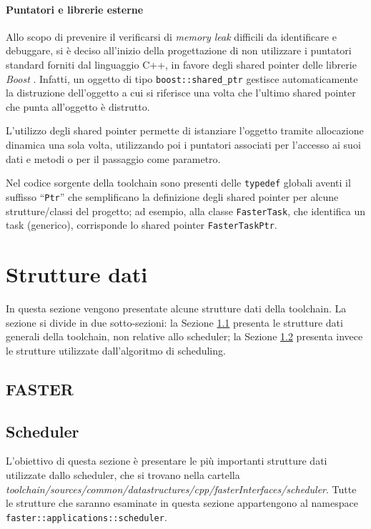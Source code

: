 \paragraph{Puntatori e librerie esterne}
Allo scopo di prevenire il verificarsi di \emph{memory leak} difficili da 
identificare e debuggare, si è deciso all'inizio della progettazione di non 
utilizzare i puntatori standard forniti dal linguaggio C++, in favore degli 
shared pointer delle librerie \emph{Boost} \cite{BoostLibrary, BoostSharedPtr}.
Infatti, un oggetto di tipo \verb+boost::shared_ptr+ gestisce automaticamente 
la distruzione dell'oggetto a cui si riferisce una volta che l'ultimo shared 
pointer che punta all'oggetto è distrutto.

L'utilizzo degli shared pointer permette di istanziare l'oggetto tramite 
allocazione dinamica una sola volta, utilizzando poi i puntatori associati per 
l'accesso ai suoi dati e metodi o per il passaggio come parametro.

Nel codice sorgente della toolchain sono presenti delle \verb+typedef+ globali 
aventi il suffisso ``\verb+Ptr+'' che semplificano la definizione degli shared 
pointer per alcune strutture/classi del progetto; ad esempio, alla classe 
\verb+FasterTask+, che identifica un task (generico), corrisponde lo shared 
pointer \verb+FasterTaskPtr+.


\section{Strutture dati}
\label{sec:struttureDati}
In questa sezione vengono presentate alcune strutture dati della toolchain. La 
sezione si divide in due sotto-sezioni: la Sezione 
\ref{subsec:struttureDatiFaster} presenta le strutture dati generali della 
toolchain, non relative allo scheduler; la Sezione 
\ref{subsec:struttureDatiScheduler} presenta invece le strutture utilizzate 
dall'algoritmo di scheduling.


\subsection{\acs{FASTER}}
\label{subsec:struttureDatiFaster}


\subsection{Scheduler}
\label{subsec:struttureDatiScheduler}
L'obiettivo di questa sezione è presentare le più importanti strutture dati 
utilizzate dallo scheduler, che si trovano nella cartella 
\emph{toolchain/sources/common/datastructures/cpp/fasterInterfaces/scheduler}. 
Tutte le strutture che saranno esaminate in questa sezione appartengono al 
namespace \verb+faster::applications::scheduler+.

